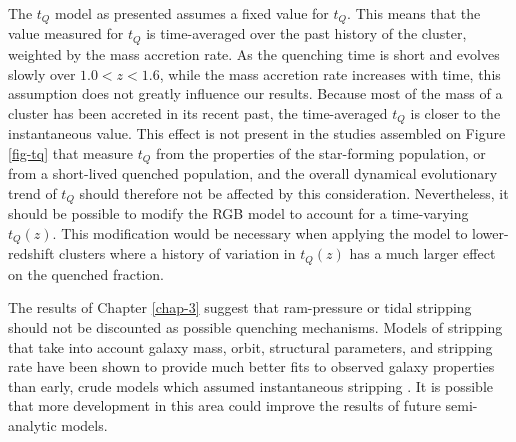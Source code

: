 
The $t_Q$ model as presented assumes a fixed value for $t_Q$.
This means that the value measured for $t_Q$ is time-averaged over the past history of the cluster, weighted by the mass accretion rate.
As the quenching time is short and evolves slowly over $1.0 < z < 1.6$, while the mass accretion rate increases with time, this assumption does not greatly influence our results.
Because most of the mass of a cluster has been accreted in its recent past, the time-averaged $t_Q$ is closer to the instantaneous value.
This effect is not present in the studies assembled on Figure \ref{fig-tq} that measure $t_Q$ from the properties of the star-forming population, or from a short-lived quenched population, and the overall dynamical evolutionary trend of $t_Q$ should therefore not be affected by this consideration.
Nevertheless, it should be possible to modify the RGB model to account for a time-varying $t_Q(z)$.
This modification would be necessary when applying the model to lower-redshift clusters where a history of variation in $t_Q(z)$ has a much larger effect on the quenched fraction.


The results of Chapter \ref{chap-3} suggest that ram-pressure or tidal stripping should not be discounted as possible quenching mechanisms.
Models of stripping that take into account galaxy mass, orbit, structural parameters, and stripping rate have been shown to provide much better fits to observed galaxy properties than early, crude models which assumed instantaneous stripping \citep{McCarthy:2008aa,Font:2008ab,Henriques:2017aa}.
It is possible that more development in this area could improve the results of future semi-analytic models.

